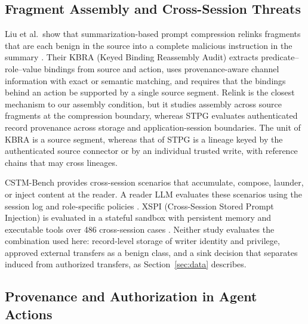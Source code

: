 \documentclass[applsci,article,submit,moreauthors]{Definitions/mdpi}
\begin{document}
\subsection{Fragment Assembly and Cross-Session Threats}
\label{sec:rel-assembly}
Liu et al.\ show that summarization-based prompt compression relinks fragments that are each benign in the source into a complete malicious instruction in the summary \cite{liu2026relink}. Their KBRA (Keyed Binding Reassembly Audit) extracts predicate--role--value bindings from source and action, uses provenance-aware channel information with exact or semantic matching, and requires that the bindings behind an action be supported by a single source segment. Relink is the closest mechanism to our assembly condition, but it studies assembly across source fragments at the compression boundary, whereas STPG evaluates authenticated record provenance across storage and application-session boundaries. The unit of KBRA is a source segment, whereas that of STPG is a lineage keyed by the authenticated source connector or by an individual trusted write, with reference chains that may cross lineages.

CSTM-Bench provides cross-session scenarios that accumulate, compose, launder, or inject content at the reader. A reader LLM evaluates these scenarios using the session log and role-specific policies \cite{azarafrooz2026cstm}. XSPI (Cross-Session Stored Prompt Injection) is evaluated in a stateful sandbox with persistent memory and executable tools over 486 cross-session cases \cite{xie2026xspi}. Neither study evaluates the combination used here: record-level storage of writer identity and privilege, approved external transfers as a benign class, and a sink decision that separates induced from authorized transfers, as Section~\ref{sec:data} describes.

\subsection{Provenance and Authorization in Agent Actions}
\label{sec:rel-prov}
\end{document}
